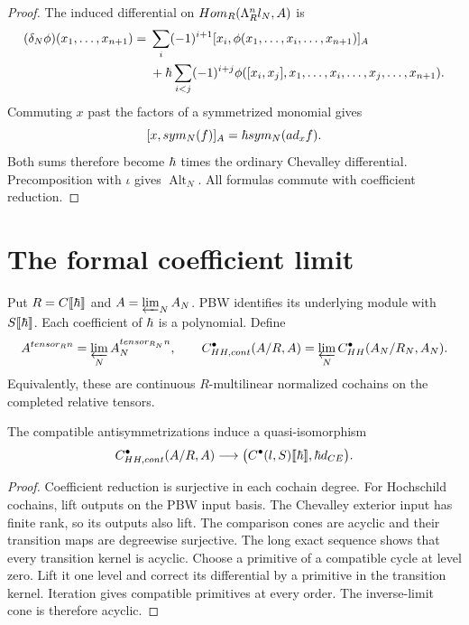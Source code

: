 \begin{proof}
The induced differential on
$Hom_R(\Lambda_R^nl_N,A)$ is
\[
\begin{split}
 (\delta_N\phi)(x_1,\ldots,x_{n+1})
 ={}&\sum_i(-1)^{i+1}
 [x_i,\phi(x_1,\ldots,x_i,\ldots,x_{n+1})]_A\\
 &+\hbar\sum_{i<j}(-1)^{i+j}
 \phi([x_i,x_j],x_1,\ldots,x_i,
                         \ldots,x_j,\ldots,x_{n+1}).
\end{split}
\]
Commuting $x$ past the factors of a symmetrized monomial gives
\[
 [x,sym_N(f)]_A
 =\hbar sym_N(ad_x f).
\]
Both sums therefore become $\hbar$ times the ordinary Chevalley differential.
Precomposition with $\iota$ gives $\operatorname{Alt}_N$.
All formulas commute with coefficient reduction.
\end{proof}

\section{The formal coefficient limit}
Put $R=C\llbracket\hbar\rrbracket$ and $A=\varprojlim_N A_N$.
PBW identifies its underlying module with $S\llbracket\hbar\rrbracket$.
Each coefficient of $\hbar$ is a polynomial.
Define
\[
 A^{tensor_R n}=\varprojlim_N A_N^{tensor_{R_N}n},
 \qquad
 C^\bullet_{HH,cont}(A/R,A)
 =\varprojlim_N C^\bullet_{HH}(A_N/R_N,A_N).
\]
Equivalently, these are continuous $R$-multilinear normalized cochains
on the completed relative tensors.

\begin{corollary}\label{cor:vol2-formal-relative-rees}
The compatible antisymmetrizations induce a quasi-isomorphism
\[
 C^\bullet_{HH,cont}(A/R,A)
 \longrightarrow
 \bigl(C^\bullet(l,S)\llbracket\hbar\rrbracket,
                    \hbar d_{CE}\bigr).
\]
\end{corollary}
\begin{proof}
Coefficient reduction is surjective in each cochain degree.
For Hochschild cochains, lift outputs on the PBW input basis.
The Chevalley exterior input has finite rank, so its outputs also lift.
The comparison cones are acyclic and their transition maps are degreewise surjective.
The long exact sequence shows that every transition kernel is acyclic.
Choose a primitive of a compatible cycle at level zero.
Lift it one level and correct its differential by a primitive in the transition kernel.
Iteration gives compatible primitives at every order.
The inverse-limit cone is therefore acyclic.
\end{proof}

